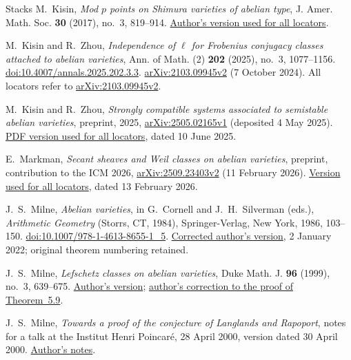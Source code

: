 \begin{thebibliography}{Stacks}
M.~Kisin,
\emph{Mod $p$ points on Shimura varieties of abelian type},
J. Amer. Math. Soc. \textbf{30} (2017), no.~3, 819--914.
\href{https://people.math.harvard.edu/~kisin/dvifiles/lr.pdf}{Author's version used for all locators}.

M.~Kisin and R.~Zhou,
\emph{Independence of $\ell$ for Frobenius conjugacy classes attached to
abelian varieties},
Ann. of Math. (2) \textbf{202} (2025), no.~3, 1077--1156.
\href{https://doi.org/10.4007/annals.2025.202.3.3}{doi:10.4007/annals.2025.202.3.3}.
\href{https://arxiv.org/abs/2103.09945v2}{arXiv:2103.09945v2} (7 October 2024).
All locators refer to
\href{https://arxiv.org/pdf/2103.09945v2}{arXiv:2103.09945v2}.

M.~Kisin and R.~Zhou,
\emph{Strongly compatible systems associated to semistable abelian varieties},
preprint, 2025,
\href{https://arxiv.org/abs/2505.02165v1}{arXiv:2505.02165v1}
(deposited 4 May 2025).
\href{https://arxiv.org/pdf/2505.02165v1}{PDF version used for all locators},
dated 10 June 2025.

E.~Markman,
\emph{Secant sheaves and Weil classes on abelian varieties},
preprint, contribution to the ICM 2026,
\href{https://arxiv.org/abs/2509.23403v2}{arXiv:2509.23403v2}
(11 February 2026).
\href{https://arxiv.org/pdf/2509.23403v2}{Version used for all locators},
dated 13 February 2026.

J.~S.~Milne,
\emph{Abelian varieties},
in G.~Cornell and J.~H.~Silverman (eds.), \emph{Arithmetic Geometry}
(Storrs, CT, 1984), Springer-Verlag, New York, 1986, 103--150.
\href{https://doi.org/10.1007/978-1-4613-8655-1_5}{doi:10.1007/978-1-4613-8655-1\_5}.
\href{https://www.jmilne.org/math/xnotes/AVs.pdf}{Corrected author's version},
2 January 2022; original theorem numbering retained.

J.~S.~Milne,
\emph{Lefschetz classes on abelian varieties},
Duke Math. J. \textbf{96} (1999), no.~3, 639--675.
\href{https://www.jmilne.org/math/articles/1999aP.pdf}{Author's version};
\href{https://www.jmilne.org/math/articles/1999a.html}{author's correction to
the proof of Theorem~5.9}.

J.~S.~Milne,
\emph{Towards a proof of the conjecture of Langlands and Rapoport},
notes for a talk at the Institut Henri Poincar\'e, 28 April 2000,
version dated 30 April 2000.
\href{https://www.jmilne.org/math/articles/2000.pdf}{Author's notes}.


\end{thebibliography}

